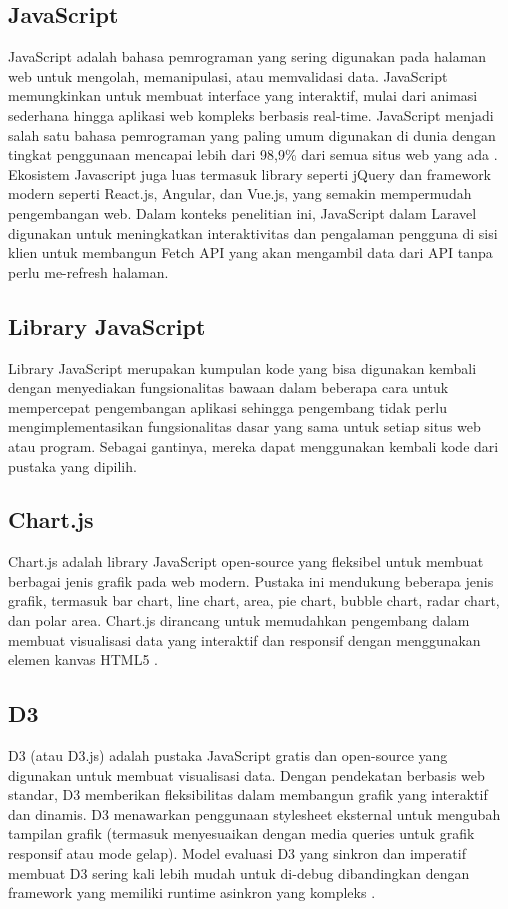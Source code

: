 \subsection{JavaScript}
JavaScript adalah bahasa pemrograman yang sering digunakan pada halaman web untuk mengolah, memanipulasi, atau memvalidasi data. JavaScript memungkinkan untuk membuat interface yang interaktif, mulai dari animasi sederhana hingga aplikasi web kompleks berbasis real-time. JavaScript menjadi salah satu bahasa pemrograman yang paling umum digunakan di dunia dengan tingkat penggunaan mencapai lebih dari 98,9\% dari semua situs web yang ada \cite{JavaScript}. Ekosistem Javascript juga luas termasuk library seperti jQuery dan framework modern seperti React.js, Angular, dan Vue.js, yang semakin mempermudah pengembangan web. Dalam konteks penelitian ini, JavaScript dalam Laravel digunakan untuk meningkatkan interaktivitas dan pengalaman pengguna di sisi klien untuk membangun Fetch API yang akan mengambil data dari API tanpa perlu me-refresh halaman.

\subsection{Library JavaScript}
Library JavaScript merupakan kumpulan kode yang bisa digunakan kembali dengan menyediakan fungsionalitas bawaan dalam beberapa cara untuk mempercepat pengembangan aplikasi sehingga pengembang tidak perlu mengimplementasikan fungsionalitas dasar yang sama untuk setiap situs web atau program. Sebagai gantinya, mereka dapat menggunakan kembali kode dari pustaka yang dipilih.

\subsection{Chart.js}
Chart.js adalah library JavaScript open-source yang fleksibel untuk membuat berbagai jenis grafik pada web modern. Pustaka ini mendukung beberapa jenis grafik, termasuk bar chart, line chart, area, pie chart, bubble chart, radar chart, dan polar area. Chart.js dirancang untuk memudahkan pengembang dalam membuat visualisasi data yang interaktif dan responsif dengan menggunakan elemen kanvas HTML5 \cite{ChartJs}.

\subsection{D3}
D3 (atau D3.js) adalah pustaka JavaScript gratis dan open-source yang digunakan untuk membuat visualisasi data. Dengan pendekatan berbasis web standar, D3 memberikan fleksibilitas dalam membangun grafik yang interaktif dan dinamis.  D3 menawarkan penggunaan stylesheet eksternal untuk mengubah tampilan grafik (termasuk menyesuaikan dengan media queries untuk grafik responsif atau mode gelap). Model evaluasi D3 yang sinkron dan imperatif membuat D3 sering kali lebih mudah untuk di-debug dibandingkan dengan framework yang memiliki runtime asinkron yang kompleks \cite{D3}.

